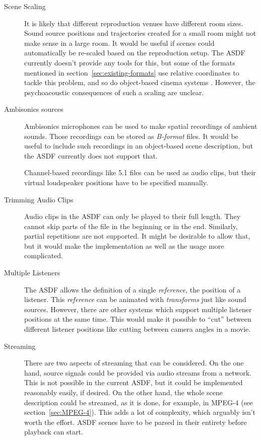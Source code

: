\begin{description}
\item[Scene Scaling]
It is likely that
different reproduction venues have different room sizes.
Sound source positions and trajectories created for a small room
might not make sense in a large room.
It would be useful if scenes could automatically be re-scaled
based on the reproduction setup.
The ASDF currently doesn't provide any tools for this,
but some of the formats mentioned in section~\ref{sec:existing-formats}
use relative coordinates to tackle this problem,
and so do
object-based cinema systems \parencite{robinson2015cinematic}.
However, the psychoacoustic consequences of such a scaling are unclear.


\item[Ambisonics sources]
Ambisonics microphones can be used to make
spatial recordings of ambient sounds.
Those recordings can be stored as \emph{B-format} files.
It would be useful to include such recordings
in an object-based scene description,
but the ASDF currently does not support that.

Channel-based recordings like 5.1 files
can be used as audio clips,
but their virtual loudspeaker positions have to be specified manually.


\item[Trimming Audio Clips]
Audio clips in the ASDF can only be played to their full length.
They cannot skip parts of the file in the beginning or in the end.
Similarly, partial repetitions are not supported.
It might be desirable to allow that,
but it would make the implementation as well as the usage more complicated.

\item[Multiple Listeners]
The ASDF allows the definition of a single \emph{reference},
\ie the position of a listener.
This \emph{reference} can be animated with \emph{transforms}
just like sound sources.
However, there are other systems which support multiple listener positions
at the same time.
This would make it possible to ``cut'' between different listener positions
like cutting between camera angles in a movie.

\item[Streaming]
There are two aspects of streaming that can be considered.
On the one hand,
source signals could be provided via audio streams from a network.
This is not possible in the current ASDF,
but it could be implemented reasonably easily, if desired.
On the other hand,
the whole scene description could be streamed,
as it is done, for example, in MPEG-4 (see section~\ref{sec:MPEG-4}).
This adds a lot of complexity, which arguably isn't worth the effort.
ASDF scenes have to be parsed in their entirety before playback can start.

\end{description}
